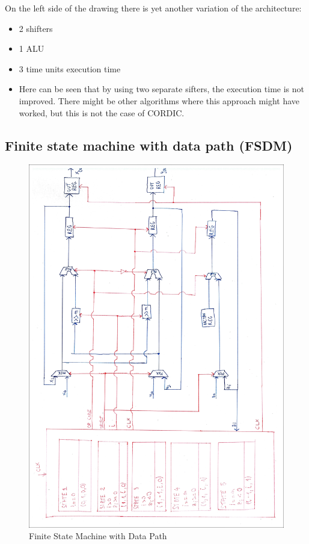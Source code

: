 \documentclass[12pt, a4paper,oneside]{article}
\begin{document}
On the left side of the drawing there is yet another variation of the architecture:

\begin{itemize}
	\item 2 shifters
	\item 1 ALU
	\item 3 time units execution time
	\item Here can be seen that by using two separate sifters, the execution time
	is not improved. There might be other algorithms where this approach might have worked,
	but this is not the case of CORDIC.
\end{itemize}

\subsection{Finite state machine with data path (FSDM)}\label{ssec:fsdm}

\begin{figure}[H]
	\centering
	\includegraphics[width = \linewidth]{finite_state_machine_edit.jpg}
	\caption{Finite State Machine with Data Path}
	\label{fig:finite_state_machine}
\end{figure}

\printbibliography
\end{document}
